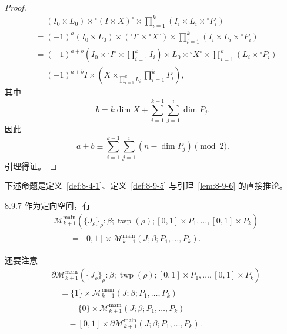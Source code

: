 \begin{proof}
\[\begin{aligned}
 &=(I_0\times L_0)\times{}^\circ(I\times X)^\circ
 \times\prod_{i=1}^{k}
 \left(I_i\times L_i\times{}^\circ P_i\right)\\
 &=(-1)^a(I_0\times L_0)
 \times({}^\circ I^\circ\times{}^\circ X^\circ)
 \times\prod_{i=1}^{k}
 \left(I_i\times L_i\times{}^\circ P_i\right)\\
 &=(-1)^{a+b}
 \left(I_0\times{}^\circ I^\circ\times\prod_{i=1}^{k}I_i\right)
 \times L_0\times{}^\circ X^\circ
 \times\prod_{i=1}^{k}(L_i\times{}^\circ P_i)\\
 &=(-1)^{a+b}I\times
 \left(X\mathop{\times}_{\prod_{i=1}^{k}L_i}
 \prod_{i=1}^{k}P_i\right),
\end{aligned}
\]
\endgroup
其中
\[
 b=k\dim X+
 \sum_{i=1}^{k-1}\sum_{j=1}^{i}\dim P_j.
\]
因此
\[
 a+b\equiv
 \sum_{i=1}^{k-1}\sum_{j=1}^{i}(n-\dim P_j)\pmod2.
\]
引理得证。
\end{proof}

下述命题是定义~\ref{def:8-4-1}、定义~\ref{def:8-9-5}
与引理~\ref{lem:8-9-6} 的直接推论。

\begin{proposition}{8.9.7}\label{prop:8-9-7}
作为定向空间，有
\[
\begin{aligned}
 &\mathcal M_{k+1}^{\mathrm{main}}
 (\{J_\rho\}_\rho:\beta;\operatorname{twp}(\rho);
 [0,1]\times P_1,\ldots,[0,1]\times P_k)\\
 &\qquad={}
 [0,1]\times\mathcal M_{k+1}^{\mathrm{main}}
 (J;\beta;P_1,\ldots,P_k).
\end{aligned}
\]
\end{proposition}

\pagebreak
还要注意
\begin{equation}
\begin{aligned}
 &\partial\mathcal M_{k+1}^{\mathrm{main}}
 (\{J_\rho\}_\rho:\beta;\operatorname{twp}(\rho);
 [0,1]\times P_1,\ldots,[0,1]\times P_k)\\
 &\quad={}
 \{1\}\times\mathcal M_{k+1}^{\mathrm{main}}
 (J;\beta;P_1,\ldots,P_k)\\
 &\qquad{}
 -\{0\}\times\mathcal M_{k+1}^{\mathrm{main}}
 (J;\beta;P_1,\ldots,P_k)\\
 &\qquad{}
 -[0,1]\times\partial\mathcal M_{k+1}^{\mathrm{main}}
 (J;\beta;P_1,\ldots,P_k).
\end{aligned}
\tag{8.9.8}\label{eq:8-9-8}
\end{equation}

